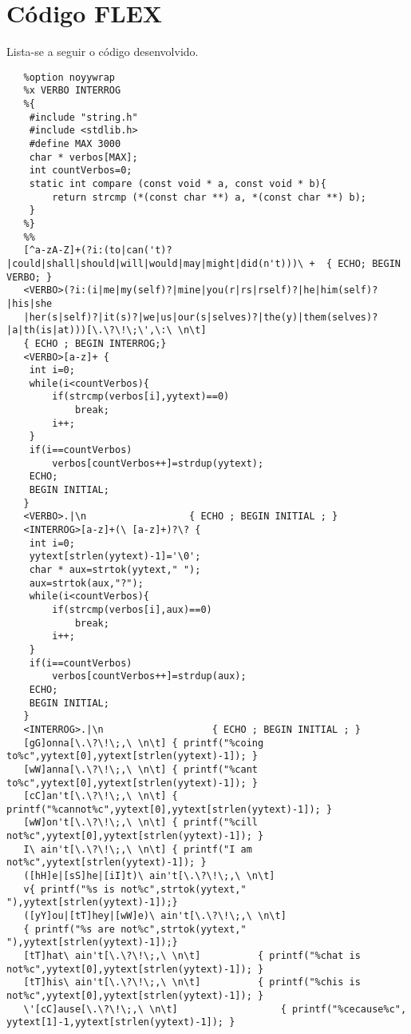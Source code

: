 \documentclass{report}
\begin{document}
\appendix
\chapter{Código FLEX}

Lista-se a seguir o código desenvolvido.
\\
\begin{verbatim}
   %option noyywrap
   %x VERBO INTERROG
   %{
   	#include "string.h"
   	#include <stdlib.h>
   	#define MAX 3000
   	char * verbos[MAX];
   	int countVerbos=0;
   	static int compare (const void * a, const void * b){
       	return strcmp (*(const char **) a, *(const char **) b);
   	}
   %}
   %%
   [^a-zA-Z]+(?i:(to|can('t)?|could|shall|should|will|would|may|might|did(n't)))\ +  { ECHO; BEGIN VERBO; }
   <VERBO>(?i:(i|me|my(self)?|mine|you(r|rs|rself)?|he|him(self)?|his|she
   |her(s|self)?|it(s)?|we|us|our(s|selves)?|the(y)|them(selves)?|a|th(is|at)))[\.\?\!\;\',\:\ \n\t]
   { ECHO ; BEGIN INTERROG;}
   <VERBO>[a-z]+ {
   	int i=0;
   	while(i<countVerbos){
       	if(strcmp(verbos[i],yytext)==0)
           	break;
       	i++;
   	}
   	if(i==countVerbos)
       	verbos[countVerbos++]=strdup(yytext);
   	ECHO;
   	BEGIN INITIAL;
   }
   <VERBO>.|\n                	{ ECHO ; BEGIN INITIAL ; }
   <INTERROG>[a-z]+(\ [a-z]+)?\? {
   	int i=0;
   	yytext[strlen(yytext)-1]='\0';
   	char * aux=strtok(yytext," ");
   	aux=strtok(aux,"?");
   	while(i<countVerbos){
       	if(strcmp(verbos[i],aux)==0)
           	break;
       	i++;
   	}
   	if(i==countVerbos)
       	verbos[countVerbos++]=strdup(aux);
   	ECHO;
   	BEGIN INITIAL;
   }
   <INTERROG>.|\n                	{ ECHO ; BEGIN INITIAL ; }
   [gG]onna[\.\?\!\;,\ \n\t] { printf("%coing to%c",yytext[0],yytext[strlen(yytext)-1]); }
   [wW]anna[\.\?\!\;,\ \n\t] { printf("%cant to%c",yytext[0],yytext[strlen(yytext)-1]); }
   [cC]an't[\.\?\!\;,\ \n\t] { printf("%cannot%c",yytext[0],yytext[strlen(yytext)-1]); }
   [wW]on't[\.\?\!\;,\ \n\t] { printf("%cill not%c",yytext[0],yytext[strlen(yytext)-1]); }
   I\ ain't[\.\?\!\;,\ \n\t] { printf("I am not%c",yytext[strlen(yytext)-1]); }
   ([hH]e|[sS]he|[iI]t)\ ain't[\.\?\!\;,\ \n\t]
   v{ printf("%s is not%c",strtok(yytext," "),yytext[strlen(yytext)-1]);}
   ([yY]ou|[tT]hey|[wW]e)\ ain't[\.\?\!\;,\ \n\t]
   { printf("%s are not%c",strtok(yytext," "),yytext[strlen(yytext)-1]);}
   [tT]hat\ ain't[\.\?\!\;,\ \n\t]       	{ printf("%chat is not%c",yytext[0],yytext[strlen(yytext)-1]); }
   [tT]his\ ain't[\.\?\!\;,\ \n\t]       	{ printf("%chis is not%c",yytext[0],yytext[strlen(yytext)-1]); }
   \'[cC]ause[\.\?\!\;,\ \n\t]              	{ printf("%cecause%c", yytext[1]-1,yytext[strlen(yytext)-1]); }

\end{verbatim}
\end{document}
